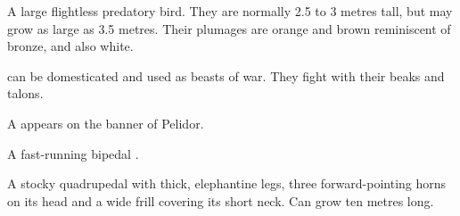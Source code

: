 \begin{gloss}
\begin{comment}
\paragraph{\grulcan}
\end{comment}
\gitem{\grulcan}
A large flightless predatory bird. 
They are normally 2.5 to 3 metres tall, but may grow as large as 3.5 metres. 
Their plumages are orange and brown reminiscent of bronze, and also white. 

\Grulcans{} can be domesticated and used as beasts of war. 
They fight with their beaks and talons. 

A \grulcan{} appears on the banner of Pelidor.










\begin{comment}
\paragraph{\miksha}
\end{comment}
\gitem{\miksha}
A fast-running bipedal . 









\begin{comment}
\paragraph{\mulgron}
\end{comment}
\gitem{\mulgron}
A stocky quadrupedal  with thick, elephantine legs, three forward-pointing horns on its head and a wide frill covering its short neck. 
Can grow ten metres long. 








\begin{comment}

\end{comment}
\end{gloss}
